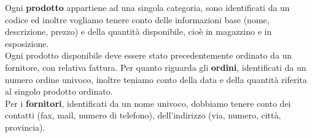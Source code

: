 Ogni \textbf{prodotto} appartiene ad una singola categoria, sono identificati da un codice ed inoltre vogliamo tenere conto delle informazioni base (nome, descrizione, prezzo) e della quantit\`a disponibile, cio\`e in magazzino e in esposizione. \\

Ogni prodotto disponibile deve essere stato precedentemente ordinato da un fornitore, con relativa fattura. Per quanto riguarda gli \textbf{ordini}, identificati da un numero ordine univoco, inoltre teniamo conto della data e della quantit\`a riferita al singolo prodotto ordinato. \\

Per i \textbf{fornitori}, identificati da un nome univoco, dobbiamo tenere conto dei contatti (fax, mail, numero di telefono), dell'indirizzo (via, numero, citt\`a, provincia).


